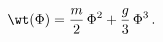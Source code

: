 \begin{equation}
\label{Wtree}
\wt(\Phi) = {m\over 2}\, \Phi^{2} + {g\over 3}\, \Phi^{3}\, .
\end{equation}

